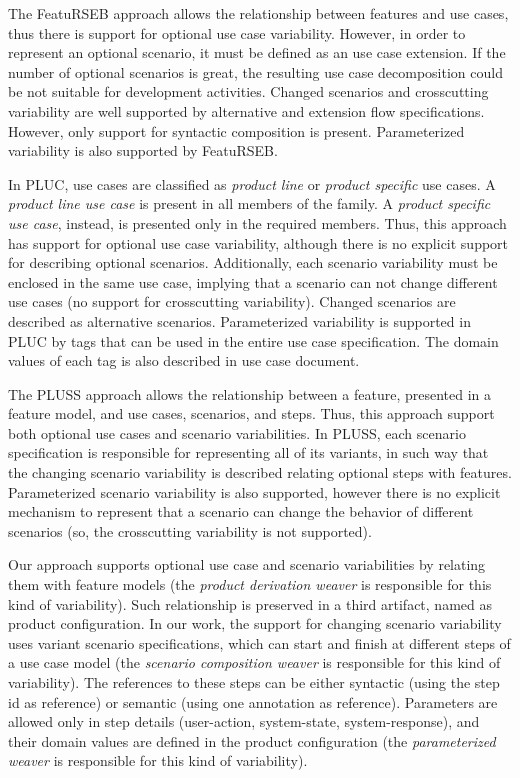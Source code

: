 \documentclass{llncs}
\begin{document}
The FeatuRSEB approach allows the relationship between features
and use cases, thus there is support for optional use case
variability. However, in order to represent an optional scenario, it
must be defined as an use case extension. If the number of optional
scenarios is great, the resulting use case decomposition could be
not suitable for development activities. Changed scenarios and
crosscutting variability are well supported by alternative and
extension flow specifications. However, only support for syntactic
composition is present. Parameterized variability is also supported
by FeatuRSEB.

In PLUC, use cases are classified as \emph{product line} or
\emph{product specific} use cases. A \emph{product line use case} is
present in all members of the family. A \emph{product specific use
case}, instead, is presented only in the required members. Thus, this approach 
has support for optional use case variability, although 
there is no explicit support for describing optional scenarios. Additionally, each scenario 
variability must be enclosed in the same
use case, implying that a scenario can not change different use
cases (no support for crosscutting variability). Changed scenarios
are described as alternative scenarios. Parameterized variability is
supported in PLUC by tags that can be used in the entire use case
specification. The domain values of each tag is also described in
use case document.

The PLUSS approach allows the relationship between a feature,
presented in a feature model, and use cases, scenarios, and steps.
Thus, this approach support both optional use cases and scenario
variabilities. In PLUSS, each scenario specification is responsible
for representing all of its variants, in such way that the changing
scenario variability is described relating optional steps with
features. Parameterized scenario variability is also supported,
however there is no explicit mechanism to represent that a scenario
can change the behavior of different scenarios (so, the
crosscutting variability is not supported).

Our approach supports optional use case and scenario
variabilities by relating them with feature models (the \emph{product derivation 
weaver} is responsible for this kind of variability). Such
relationship is preserved in a third artifact, named as product
configuration. In our work, the support for changing scenario
variability uses variant scenario specifications, which can
start and finish at different steps of a use case model (the \emph{scenario 
composition weaver} is responsible for this kind of variability). The
references to these steps can be either syntactic (using the step id
as reference) or semantic (using one annotation as reference).
Parameters are allowed only in step details (user-action,
system-state, system-response), and their domain
values are defined in the product configuration (the \emph{parameterized weaver} is 
responsible for this kind of variability).
\end{document}
